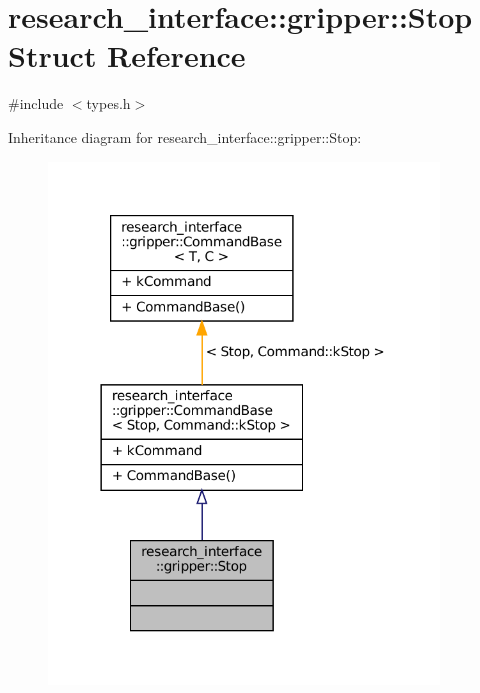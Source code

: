 \hypertarget{structresearch__interface_1_1gripper_1_1Stop}{}\section{research\+\_\+interface\+:\+:gripper\+:\+:Stop Struct Reference}
\label{structresearch__interface_1_1gripper_1_1Stop}


{\ttfamily \#include $<$types.\+h$>$}



Inheritance diagram for research\+\_\+interface\+:\+:gripper\+:\+:Stop\+:
\nopagebreak
\begin{figure}[H]
\begin{center}
\leavevmode
\includegraphics[width=294pt]{structresearch__interface_1_1gripper_1_1Stop__inherit__graph}
\end{center}
\end{figure}



